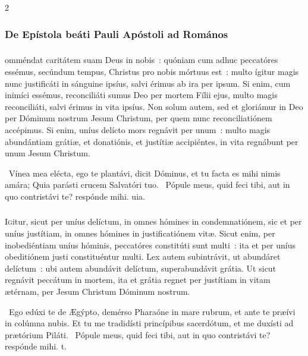 \documentclass[9pt,twoside]{extarticle}
\begin{document}
\begin{multicols}{2}
{{\subsubsection*{\center De Epístola beáti Pauli Apóstoli ad Romános}
\subsubsection*{\center {}}
omméndat caritátem suam Deus in nobis~: quóniam cum adhuc peccatóres essémus, secúndum tempus, Christus pro nobis mórtuus est~: multo ígitur magis nunc justificáti in sánguine ipsíus, salvi érimus ab ira per ipsum. Si enim, cum inimíci essémus, reconciliáti sumus Deo per mortem Fílii ejus, multo magis reconciliáti, salvi érimus in vita ipsíus. Non solum autem, sed et gloriámur in Deo per Dóminum nostrum Jesum Christum, per quem nunc reconciliatiónem accépimus. Si enim, uníus delícto mors regnávit per unum~: multo magis abundántiam grátiæ, et donatiónis, et justítiæ accipiéntes, in vita regnábunt per unum Jesum Christum.

\begin{tightlist}{}
\item {}~Vínea mea elécta, ego te plantávi, dicit Dóminus, et tu facta es mihi nimis amára; \textred{*} Quia parásti crucem Salvatóri tuo. ~Pópule meus, quid feci tibi, aut in quo contristávi te? respónde mihi. uia.
\end{tightlist}

\subsubsection*{\center{}}
\lettrine{I}gitur, sicut per uníus delíctum, in omnes hómines in condemnatiónem, sic et per uníus justítiam, in omnes hómines in justificatiónem vitæ. Sicut enim, per inobediéntiam uníus hóminis, peccatóres constitúti sunt multi~: ita et per uníus obeditiónem justi constituéntur multi. Lex autem subintrávit, ut abundáret delíctum~: ubi autem abundávit delíctum, superabundávit grátia. Ut sicut regnávit peccátum in mortem, ita et grátia regnet per justítiam in vitam ætérnam, per Jesum Christum Dóminum nostrum.

\begin{tightlist}{}
\item {}~Ego edúxi te de Ægýpto, demérso Pharaóne in mare rubrum, et ante te præívi in colúmna nubis. \textred{*} Et tu me tradidísti princípibus sacerdótum, et me duxísti ad prætórium Piláti. ~Pópule meus, quid feci tibi, aut in quo contristávi te? respónde mihi. t.
\end{tightlist}

}}
\end{multicols}
\end{document}
